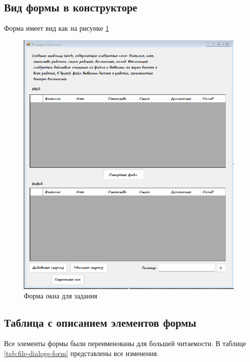 \subsection{Вид формы в конструкторе}
Форма имеет вид как на рисунке \ref{fig:file-dialogs-form}

\begin{figure}
\centering
\includegraphics[width=0.5\linewidth]{images/file-dialogs/form.png}
\caption{Форма окна для задания}
\label{fig:file-dialogs-form}
\end{figure}

\subsection{Таблица с описанием элементов формы}
Все элементы формы были переименованы для большей читаемости. В таблице \ref{tab:file-dialogs-form} представлены все изменения.


